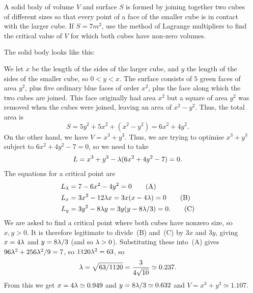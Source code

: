 \documentclass[a4paper]{amsart}
\renewenvironment{solution}{\SolutionInline}{\endSolutionInline}
\begin{document}
\begin{exercise}
 A solid body of volume $V$ and surface $S$ is formed by joining together
 two cubes of different sizes so that every point of a face of the smaller
 cube is in contact with the larger cube. If $S=7m^2$, use the method of
 Lagrange multipliers to find the critical value of $V$ for which both
 cubes have non-zero volumes.
\end{exercise}
\begin{solution}
 The solid body looks like this:
 \begin{center}
 \end{center}
 We let $x$ be the length of the sides of the larger cube, and $y$ the
 length of the sides of the smaller cube, so $0<y<x$.  The surface
 consists of $5$ green faces of area $y^2$, plus five ordinary blue
 faces of order $x^2$, plus the face along which the two cubes are
 joined.  This face originally had area $x^2$ but a square of area
 $y^2$ was removed when the cubes were joined, leaving an area of
 $x^2-y^2$.  Thus, the total area is
 \[ S = 5y^2 + 5x^2 + (x^2-y^2) = 6x^2+4y^2. \]
 On the other hand, we have $V=x^3+y^3$.  Thus, we are trying to
 optimise $x^3+y^3$ subject to $6x^2+4y^2-7=0$, so we need to take
 \[ L = x^3+y^3 - \lambda(6x^2+4y^2-7) = 0. \]
 The equations for a critical point are
 \begin{align*}
  L_\lambda &= 7-6x^2-4y^2 = 0 \tag{A} \\
  L_x &= 3x^2-12\lambda x = 3x(x-4\lambda) = 0 \tag{B} \\
  L_y &= 3y^2-8\lambda y = 3y(y-8\lambda/3) = 0. \tag{C}
 \end{align*}
 We are asked to find a critical point where both cubes have nonzero
 size, so $x,y>0$.  It is therefore legitimate to divide~(B) and~(C)
 by $3x$ and $3y$, giving $x=4\lambda$ and $y=8\lambda/3$ (and so $\lambda>0$).
 Substituting these into~(A) gives $96\lambda^2+256\lambda^2/9=7$, so
 $1120\lambda^2=63$, so 
 \[ \lambda=\sqrt{63/1120}=\frac{3}{4\sqrt{10}}\simeq 0.237. \]
 From this we get $x=4\lambda\simeq 0.949$ and $y=8\lambda/3\simeq 0.632$ and
 $V=x^3+y^3\simeq 1.107$.


\end{solution}
\end{document}
